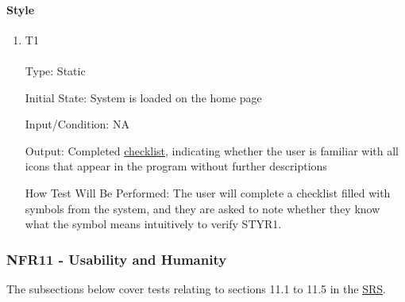\documentclass[12pt, titlepage]{article}
\begin{document}
\paragraph{Style}
\begin{enumerate}
\item {T1\\}\\
\hypertarget{NFR10.2-TC1}{}
Type: Static

Initial State: System is loaded on the home page

Input/Condition: NA

Output: Completed \hyperlink{checklist-nfr10}{checklist}, indicating whether the user is familiar with all icons that appear in the program without further descriptions

How Test Will Be Performed: The user will complete a checklist filled with symbols from the system, and they are asked to note whether they know what the symbol means intuitively to verify STYR1.
\end{enumerate}

\hypertarget{nfr11}{}
\subsubsection{NFR11 - Usability and Humanity}

The subsections below cover tests relating to sections 11.1 to 11.5 in the \href{https://shorturl.at/FdAgR}{SRS}.
\end{document}
